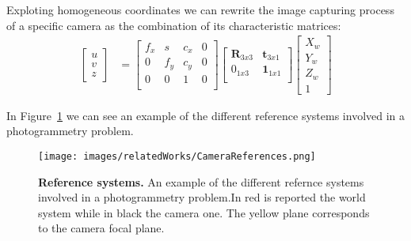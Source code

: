 Exploting homogeneous coordinates we can rewrite the image capturing 
process of a specific camera as the combination of its characteristic matrices:
\begin{align*}
    \begin{bmatrix}
        u \\
        v \\
        z
      \end{bmatrix}
    &= \begin{bmatrix}
        f_{x} & s & c_{x} & 0 \\
        0 & f_{y} & c_{y} & 0\\
        0 & 0     & 1     & 0\\
      \end{bmatrix} \begin{bmatrix}
        \textbf{R}_{3x3} & \textbf{t}_{3x1}  \\
        0_{1x3} & \textbf{1}_{1x1}  \\
      \end{bmatrix}
      \begin{bmatrix}
        X_w \\
        Y_w \\
        Z_w \\
        1    
      \end{bmatrix}
  \end{align*}

In Figure~\ref{fig:reference_systems} we can see an example of the different reference systems involved in a photogrammetry problem.
  \begin{figure}
    \centering
    \texttt{[image: images/relatedWorks/CameraReferences.png]} %
    \caption{\textbf{Reference systems.} An example of the different refernce systems involved in a photogrammetry problem.In red is reported
    the world system while in black the camera one. The yellow plane corresponds to the camera focal plane.}
    \label{fig:reference_systems}
  \end{figure}






